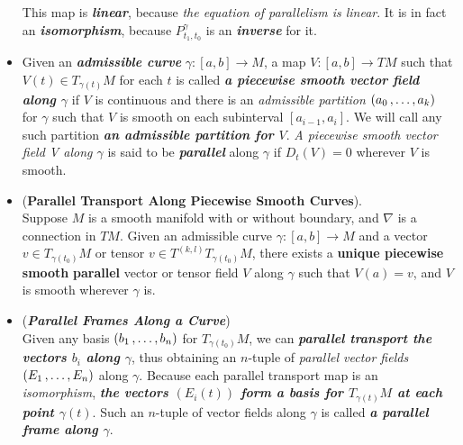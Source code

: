 \documentclass[11pt]{article}
\begin{document}
\begin{itemize}
\begin{definition}
This map is \emph{\textbf{linear}}, because \emph{the equation of parallelism is linear}. It is in fact an \emph{\textbf{isomorphism}}, because $P^{\gamma}_{t_1, t_0}$ is an \emph{\textbf{inverse}} for it.
\end{definition}

\item \begin{definition}
Given an \emph{\textbf{admissible curve}} $\gamma: [a, b] \rightarrow M$, a map $V: [a, b] \rightarrow TM$ such that $V(t) \in T_{\gamma(t)}M$ for each $t$ is called \emph{\textbf{a piecewise smooth vector field along $\gamma$}} if $V$ is continuous and there is an \emph{admissible partition} $(a_0 \,{,}\ldots{,}\, a_k)$ for $\gamma$ such that $V$ is smooth on each subinterval $[a_{i-1}, a_i]$. We will call any such partition \emph{\textbf{an admissible partition for $V$}}. \emph{A piecewise smooth vector field V along $\gamma$} is said to be \emph{\textbf{parallel}} along $\gamma$ if $D_t(V) = 0$ wherever $V$ is smooth.
\end{definition}

\item \begin{corollary} (\textbf{Parallel Transport Along Piecewise Smooth Curves}). \\
Suppose $M$ is a smooth manifold with or without boundary, and $\nabla$ is a connection in $TM$. Given an admissible curve $\gamma: [a, b] \rightarrow M$ and a vector $v \in T_{\gamma(t_0)}M$ or tensor $v \in T^{(k,l)}T_{\gamma(t_0)}M$, there exists a \textbf{unique piecewise smooth} \textbf{parallel} vector or tensor field $V$ along $\gamma$ such that $V(a) = v$, and $V$ is smooth wherever $\gamma$ is.
\end{corollary}

\item \begin{remark} (\emph{\textbf{Parallel Frames Along a Curve}})\\
Given any basis $(b_1 \,{,}\ldots{,}\, b_n)$ for $T_{\gamma(t_0)}M$, we can \emph{\textbf{parallel transport the vectors $b_i$ along $\gamma$}}, thus obtaining an $n$-tuple of \emph{parallel vector fields} $(E_1 \,{,}\ldots{,}\, E_n)$  along $\gamma$. Because each parallel transport map is an \emph{isomorphism}, \emph{\textbf{the vectors $(E_i(t))$ form a basis for $T_{\gamma(t)}M$ at each point $\gamma(t)$}}. Such an $n$-tuple of vector fields along $\gamma$ is called \emph{\textbf{a
parallel frame along $\gamma$}}.


\end{remark}
\end{itemize}
\end{document}

